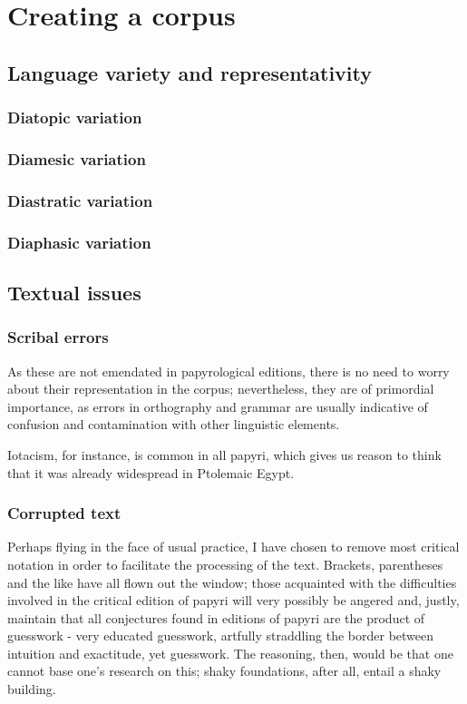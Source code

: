 \chapter{Creating a corpus}
\label{chp:corpuscreation}
\minitoc\mtcskip
\section{Language variety and representativity}
\label{sect:variety}
\subsection{Diatopic variation}
\label{subsect:diatopic}
\subsection{Diamesic variation}
\label{subsect:diamesic}
\subsection{Diastratic variation}
\label{subsect:diastratic}
\subsection{Diaphasic variation}
\label{subsect:diaphasic}
\section{Textual issues}
\label{sect:textualissues}
\subsection{Scribal errors}
\label{subsect:scribalerrors}
As these are not emendated in papyrological editions, there is no need to worry
about their representation in the corpus; nevertheless, they are of primordial
importance, as errors in orthography and grammar are usually indicative of
confusion and contamination with other linguistic elements.

Iotacism, for instance, is common in all papyri, which gives us reason to think
that it was already widespread in Ptolemaic Egypt.
\subsection{Corrupted text}
\label{subsect:corruptedtext}
Perhaps flying in the face of usual practice, I have chosen to remove most
critical notation in order to facilitate the processing of the text. Brackets,
parentheses and the like have all flown out the window; those acquainted with
the difficulties involved in the critical edition of papyri will very possibly
be angered and, justly, maintain that all conjectures found in editions of
papyri are the product of guesswork - very educated guesswork, artfully
straddling the border between intuition and exactitude, yet guesswork. The
reasoning, then, would be that one cannot base one's research on this; shaky
foundations, after all, entail a shaky building.

